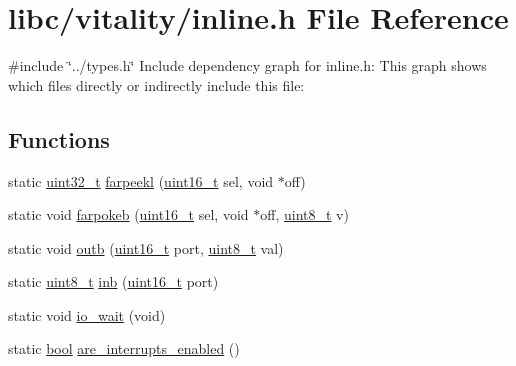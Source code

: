 \hypertarget{a00026}{}\section{libc/vitality/inline.h File Reference}
\label{a00026}
{\ttfamily \#include \char`\"{}../types.\+h\char`\"{}}\newline
Include dependency graph for inline.\+h\+:
This graph shows which files directly or indirectly include this file\+:
\subsection*{Functions}
\begin{DoxyCompactItemize}
\item 
static \hyperlink{a00023_a435d1572bf3f880d55459d9805097f62_a435d1572bf3f880d55459d9805097f62}{uint32\+\_\+t} \hyperlink{a00026_aee0779a0581136320f91a72c4d6b5b90_aee0779a0581136320f91a72c4d6b5b90}{farpeekl} (\hyperlink{a00023_a273cf69d639a59973b6019625df33e30_a273cf69d639a59973b6019625df33e30}{uint16\+\_\+t} sel, void $\ast$off)
\item 
static void \hyperlink{a00026_a4e7b04b927c6dca2d20f54a5c14a01d6_a4e7b04b927c6dca2d20f54a5c14a01d6}{farpokeb} (\hyperlink{a00023_a273cf69d639a59973b6019625df33e30_a273cf69d639a59973b6019625df33e30}{uint16\+\_\+t} sel, void $\ast$off, \hyperlink{a00023_aba7bc1797add20fe3efdf37ced1182c5_aba7bc1797add20fe3efdf37ced1182c5}{uint8\+\_\+t} v)
\item 
static void \hyperlink{a00026_aa37f5841c54156a4b14fc0d6f626b44f_aa37f5841c54156a4b14fc0d6f626b44f}{outb} (\hyperlink{a00023_a273cf69d639a59973b6019625df33e30_a273cf69d639a59973b6019625df33e30}{uint16\+\_\+t} port, \hyperlink{a00023_aba7bc1797add20fe3efdf37ced1182c5_aba7bc1797add20fe3efdf37ced1182c5}{uint8\+\_\+t} val)
\item 
static \hyperlink{a00023_aba7bc1797add20fe3efdf37ced1182c5_aba7bc1797add20fe3efdf37ced1182c5}{uint8\+\_\+t} \hyperlink{a00026_a0223c8898dfec29069879dc51076e28a_a0223c8898dfec29069879dc51076e28a}{inb} (\hyperlink{a00023_a273cf69d639a59973b6019625df33e30_a273cf69d639a59973b6019625df33e30}{uint16\+\_\+t} port)
\item 
static void \hyperlink{a00026_a488d1b3600792ee3aac5be4b7e0be16b_a488d1b3600792ee3aac5be4b7e0be16b}{io\+\_\+wait} (void)
\item 
static \hyperlink{a00023_af6a258d8f3ee5206d682d799316314b1_af6a258d8f3ee5206d682d799316314b1}{bool} \hyperlink{a00026_ae7df27a6150c6a020eead928af349b21_ae7df27a6150c6a020eead928af349b21}{are\+\_\+interrupts\+\_\+enabled} ()

\end{DoxyCompactItemize}

